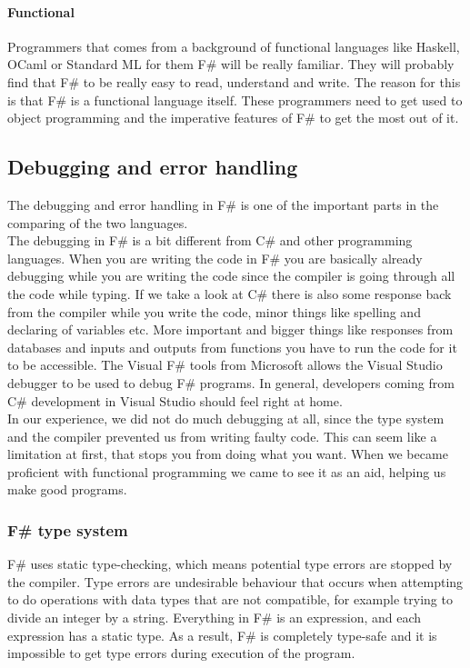 \documentclass[12pt, a4paper]{article}
\begin{document}
\paragraph{Functional}
Programmers that comes from a background of functional languages like Haskell, OCaml or Standard ML for them F\# will be really familiar. They will probably find that F\# to be really easy to read, understand and write. The reason for this is that F\# is a functional language itself. These programmers need to get used to object programming and the imperative features of F\# to get the most out of it.

\newpage
\subsection{Debugging and error handling}
\label{debug}

The debugging and error handling in F\# is one of the important parts in the comparing of the two languages.\\

The debugging in F\# is a bit different from C\# and other programming languages. When you are writing the code in F\# you are basically already debugging while you are writing the code since the compiler is going through all the code while typing. If we take a look at C\# there is also some response back from the compiler while you write the code, minor things like spelling and declaring of variables etc. More important and bigger things like responses from databases and inputs and outputs from functions you have to run the code for it to be accessible. The Visual F\# tools from Microsoft allows the Visual Studio debugger to be used to debug F\# programs. In general, developers coming from C\# development in Visual Studio should feel right at home.\\

In our experience, we did not do much debugging at all, since the type system and the compiler prevented us from writing faulty code. This can seem like a limitation at first, that stops you from doing what you want. When we became proficient with functional programming we came to see it as an aid, helping us make good programs.

\subsubsection{F\# type system}
F\# uses static type-checking, which means potential type errors are stopped by the compiler. Type errors are undesirable behaviour that occurs when attempting to do operations with data types that are not compatible, for example trying to divide an integer by a string. Everything in F\# is an expression, and each expression has a static type. As a result, F\# is completely type-safe and it is impossible to get type errors during execution of the program.
\end{document}
